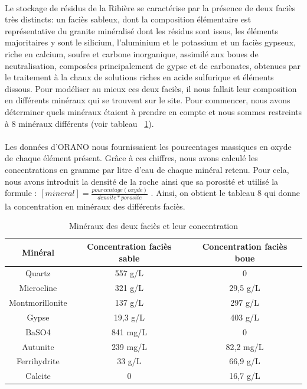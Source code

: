 \documentclass{article}
\begin{document}
\paragraph{} Le stockage de résidus de la Ribière se caractérise par la présence de deux faciès très distincts: un faciès sableux, dont la composition élémentaire est représentative du granite minéralisé dont les résidus sont issus, les éléments majoritaires y sont le silicium, l’aluminium et le potassium et un faciès gypseux, riche en calcium, soufre et carbone inorganique, assimilé aux boues de neutralisation, composées principalement de gypse et de carbonates, obtenues par le traitement à la chaux de solutions riches en acide sulfurique et éléments dissous. Pour modéliser au mieux ces deux faciès, il nous fallait leur composition en différents minéraux qui se trouvent sur le site. Pour commencer, nous avons déterminer quels minéraux étaient à prendre en compte et nous sommes restreints à 8 minéraux différents (voir tableau~ \ref{tab:mineraux_concentrations}).
\paragraph{} Les données d'ORANO nous fournissaient les pourcentages massiques en oxyde de chaque élément présent. Grâce à ces chiffres, nous avons calculé les concentrations en gramme par litre d'eau de chaque minéral retenu. Pour cela, nous avons introduit la densité de la roche ainsi que sa porosité et utilisé la formule : $[mineral] = \frac{pourcentage(oxyde)}{densite * porosite} $ . Ainsi, on obtient le tableau 8 qui donne la concentration en minéraux des différents faciès.

\begin{table}[H]
    \centering    
    \caption{Minéraux des deux faciès et leur concentration }
    \begin{tabular}{ |c |c |c |}
        \hline
         \textbf{Minéral} & \textbf{Concentration faciès sable} & \textbf{Concentration faciès boue}\\ 
         \hline
         Quartz & 557 g/L & 0 \\ 
         \hline
         Microcline & 321 g/L & 29,5 g/L  \\
         \hline
         Montmorillonite & 137 g/L & 297 g/L  \\
         \hline
         Gypse & 19,3 g/L & 403 g/L  \\
         \hline
         BaSO4 & 841 mg/L & 0  \\
          \hline
         Autunite & 239 mg/L & 82,2 mg/L  \\
          \hline
         Ferrihydrite & 33 g/L & 66,9 g/L  \\
          \hline
         Calcite & 0 & 16,7 g/L \\
         \hline
    \end{tabular}

    \label{tab:mineraux_concentrations}
\end{table}
\end{document}
